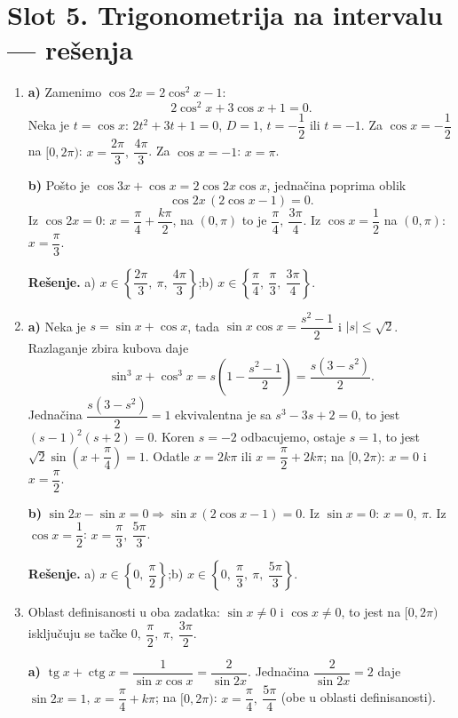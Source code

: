 \section*{Slot 5. Trigonometrija na intervalu — rešenja}
\begin{enumerate}[label=\arabic*.]
\item \textbf{a)} Zamenimo $\cos 2x = 2\cos^2 x - 1$:
\[2\cos^2 x + 3\cos x + 1 = 0.\]
Neka je $t=\cos x$: $2t^2+3t+1=0$, $D=1$, $t=-\dfrac12$ ili $t=-1$.
Za $\cos x=-\dfrac12$ na $[0,2\pi)$: $x=\dfrac{2\pi}{3},\ \dfrac{4\pi}{3}$. Za $\cos x=-1$: $x=\pi$.

\textbf{b)} Pošto je $\cos 3x+\cos x = 2\cos 2x\cos x$, jednačina poprima oblik
\[\cos 2x\,(2\cos x-1)=0.\]
Iz $\cos 2x=0$: $x=\dfrac{\pi}{4}+\dfrac{k\pi}{2}$, na $(0,\pi)$ to je $\dfrac{\pi}{4},\ \dfrac{3\pi}{4}$. Iz $\cos x=\dfrac12$ na $(0,\pi)$: $x=\dfrac{\pi}{3}$.

\textbf{Rešenje.} a) $x\in\left\{\dfrac{2\pi}{3},\ \pi,\ \dfrac{4\pi}{3}\right\}$;\quad b) $x\in\left\{\dfrac{\pi}{4},\ \dfrac{\pi}{3},\ \dfrac{3\pi}{4}\right\}$.

\item \textbf{a)} Neka je $s=\sin x+\cos x$, tada $\sin x\cos x=\dfrac{s^2-1}{2}$ i $|s|\le\sqrt2$. Razlaganje zbira kubova daje
\[\sin^3 x+\cos^3 x=s\left(1-\frac{s^2-1}{2}\right)=\frac{s(3-s^2)}{2}.\]
Jednačina $\dfrac{s(3-s^2)}{2}=1$ ekvivalentna je sa $s^3-3s+2=0$, to jest $(s-1)^2(s+2)=0$. Koren $s=-2$ odbacujemo, ostaje $s=1$, to jest $\sqrt2\sin\!\left(x+\dfrac{\pi}{4}\right)=1$. Odatle $x=2k\pi$ ili $x=\dfrac{\pi}{2}+2k\pi$; na $[0,2\pi)$: $x=0$ i $x=\dfrac{\pi}{2}$.

\textbf{b)} $\sin 2x-\sin x=0\Rightarrow \sin x\,(2\cos x-1)=0$. Iz $\sin x=0$: $x=0,\ \pi$. Iz $\cos x=\dfrac12$: $x=\dfrac{\pi}{3},\ \dfrac{5\pi}{3}$.

\textbf{Rešenje.} a) $x\in\left\{0,\ \dfrac{\pi}{2}\right\}$;\quad b) $x\in\left\{0,\ \dfrac{\pi}{3},\ \pi,\ \dfrac{5\pi}{3}\right\}$.

\item Oblast definisanosti u oba zadatka: $\sin x\ne 0$ i $\cos x\ne 0$, to jest na $[0,2\pi)$ isključuju se tačke $0,\ \dfrac{\pi}{2},\ \pi,\ \dfrac{3\pi}{2}$.

\textbf{a)} $\operatorname{tg} x+\operatorname{ctg} x=\dfrac{1}{\sin x\cos x}=\dfrac{2}{\sin 2x}$. Jednačina $\dfrac{2}{\sin 2x}=2$ daje $\sin 2x=1$, $x=\dfrac{\pi}{4}+k\pi$; na $[0,2\pi)$: $x=\dfrac{\pi}{4},\ \dfrac{5\pi}{4}$ (obe u oblasti definisanosti).


\end{enumerate}

